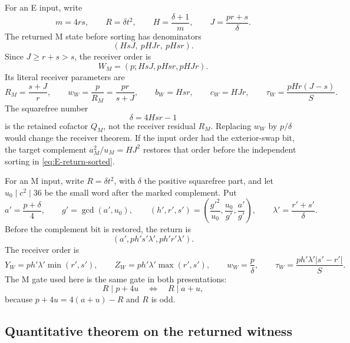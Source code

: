 For an E input, write
\[
 m=4rs,\qquad R=\delta t^2,\qquad
 H=\frac{\delta+1}{m},\qquad J=\frac{pr+s}{\delta}.
\]
The returned M state before sorting has denominators
\[
 (HsJ,\ pHJr,\ pHsr).
\]
Since \(J\ge r+s>s\), the receiver order is
\begin{equation}\label{eq:E-return-sorted}
 W_M=(p;HsJ,pHsr,pHJr).
\end{equation}
Its literal receiver parameters are
\begin{equation}\label{eq:E-return-parameters}
 R_M=\frac{s+J}{r},\qquad
 w_W=\frac{p}{R_M}=\frac{pr}{s+J},\qquad
 b_W=Hsr,\qquad c_W=HJr,\qquad
 \tau_W=\frac{pHr(J-s)}{S}.
\end{equation}
The squarefree number
\[
 \delta=4Hsr-1
\]
is the retained cofactor \(Q_M\), not the receiver residual \(R_M\).
Replacing \(w_W\) by \(p/\delta\) would change the receiver theorem.  If
the input order had the exterior-swap bit, the target complement
\(a_M^2/u_M=HJ^2\) restores that order before the independent sorting in
\eqref{eq:E-return-sorted}.

For an M input, write \(R=\delta t^2\), with \(\delta\) the positive squarefree
part, and let \(u_0\mid c^2\mid36\) be the small word after the marked
complement.  Put
\[
 a'=\frac{p+\delta}{4},\qquad g'=\gcd(a',u_0),\qquad
 (h',r',s')=\left(\frac{g'^2}{u_0},\frac{u_0}{g'},\frac{a'}{g'}\right),
 \qquad \lambda'=\frac{r'+s'}{\delta}.
\]
Before the complement bit is restored, the return is
\[
 (a',ph's'\lambda',ph'r'\lambda').
\]
The receiver order is
\begin{equation}\label{eq:M-return-sorted}
 Y_W=ph'\lambda'\min(r',s'),\qquad
 Z_W=ph'\lambda'\max(r',s'),\qquad
 w_W=\frac p\delta,\qquad
 \tau_W=\frac{ph'\lambda'|s'-r'|}{S}.
\end{equation}
The M gate used here is the same gate in both presentations:
\[
 R\mid p+4u\quad\Longleftrightarrow\quad R\mid a+u,
\]
because \(p+4u=4(a+u)-R\) and \(R\) is odd.

\subsection{Quantitative theorem on the returned witness}

